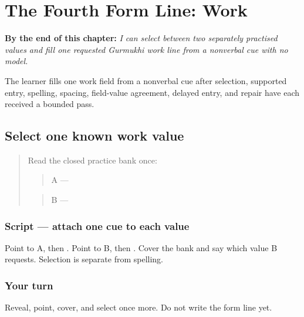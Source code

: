 
\chapter{The Fourth Form Line: Work}
\label{ch:pa-form-work}

\begin{chapteropening}
\textbf{By the end of this chapter:} \emph{I can select between two separately practised values and fill one requested Gurmukhi work line from a nonverbal cue with no model.}

The learner fills one work field from a nonverbal cue after selection, supported entry, spelling, spacing, field-value agreement, delayed entry, and repair have each received a bounded pass.
\end{chapteropening}

\section[A / B (two work-value cues)]{Select one known work value}

\label{lesson:PA-W05-work-select}



\begin{quote}
Read the closed practice bank once:

\begin{quote}
A — \textbf{}
\end{quote}

\begin{quote}
B — \textbf{}
\end{quote}
\end{quote}

\subsection*{Script — attach one cue to each value}
Point to A, then \textbf{}. Point to B, then \textbf{}. Cover the bank and say which value B requests. Selection is separate from spelling.

\subsection*{Your turn}
Reveal, point, cover, and select once more. Do not write the form line yet.

